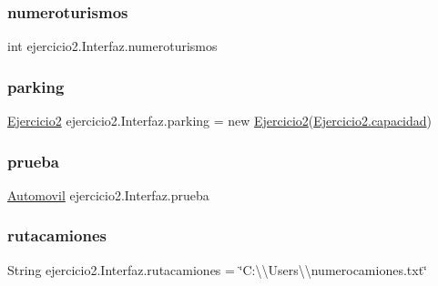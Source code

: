 \subsubsection{\texorpdfstring{numeroturismos}{numeroturismos}}
{\footnotesize\ttfamily int ejercicio2.\+Interfaz.\+numeroturismos\hspace{0.3cm}{\ttfamily [static]}}

\mbox{\label{classejercicio2_1_1_interfaz_a842172c35a09f908f9acb6799b2e9ed9}} 
\subsubsection{\texorpdfstring{parking}{parking}}
{\footnotesize\ttfamily \mbox{\hyperlink{classejercicio2_1_1_ejercicio2}{Ejercicio2}} ejercicio2.\+Interfaz.\+parking = new \mbox{\hyperlink{classejercicio2_1_1_ejercicio2}{Ejercicio2}}(\mbox{\hyperlink{classejercicio2_1_1_ejercicio2_a67160aed137820bd3e65ebd3a709ace7}{Ejercicio2.\+capacidad}})\hspace{0.3cm}{\ttfamily [static]}}

\mbox{\label{classejercicio2_1_1_interfaz_a169b4ffdd68296971e6db4079bb6269d}} 
\subsubsection{\texorpdfstring{prueba}{prueba}}
{\footnotesize\ttfamily \mbox{\hyperlink{classejercicio2_1_1_automovil}{Automovil}} ejercicio2.\+Interfaz.\+prueba\hspace{0.3cm}{\ttfamily [static]}}

\mbox{\label{classejercicio2_1_1_interfaz_a78395e467465db3af1017176104a3285}} 
\subsubsection{\texorpdfstring{rutacamiones}{rutacamiones}}
{\footnotesize\ttfamily String ejercicio2.\+Interfaz.\+rutacamiones = \char`\"{}C\+:\textbackslash{}\textbackslash{}\+Users\textbackslash{}\textbackslash{}numerocamiones.\+txt\char`\"{}\hspace{0.3cm}{\ttfamily [static]}}

